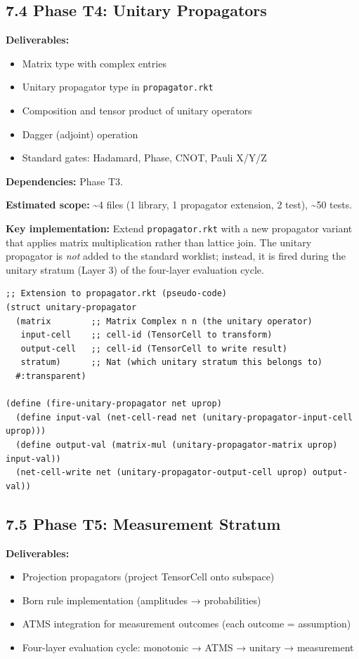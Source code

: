 \documentclass[11pt]{article}
\begin{document}
\subsection{7.4 Phase T4: Unitary Propagators}
\label{sec:orga794a54}

\textbf{Deliverables:}
\begin{itemize}
\item Matrix type with complex entries
\item Unitary propagator type in \texttt{propagator.rkt}
\item Composition and tensor product of unitary operators
\item Dagger (adjoint) operation
\item Standard gates: Hadamard, Phase, CNOT, Pauli X/Y/Z
\end{itemize}

\textbf{Dependencies:} Phase T3.

\textbf{Estimated scope:} \textasciitilde{}4 files (1 library, 1 propagator extension, 2 test), \textasciitilde{}50 tests.

\textbf{Key implementation:} Extend \texttt{propagator.rkt} with a new propagator variant that
applies matrix multiplication rather than lattice join. The unitary propagator is
\emph{not} added to the standard worklist; instead, it is fired during the unitary
stratum (Layer 3) of the four-layer evaluation cycle.

\begin{verbatim}
;; Extension to propagator.rkt (pseudo-code)
(struct unitary-propagator
  (matrix        ;; Matrix Complex n n (the unitary operator)
   input-cell    ;; cell-id (TensorCell to transform)
   output-cell   ;; cell-id (TensorCell to write result)
   stratum)      ;; Nat (which unitary stratum this belongs to)
  #:transparent)

(define (fire-unitary-propagator net uprop)
  (define input-val (net-cell-read net (unitary-propagator-input-cell uprop)))
  (define output-val (matrix-mul (unitary-propagator-matrix uprop) input-val))
  (net-cell-write net (unitary-propagator-output-cell uprop) output-val))
\end{verbatim}
\subsection{7.5 Phase T5: Measurement Stratum}
\label{sec:org5bfccdc}

\textbf{Deliverables:}
\begin{itemize}
\item Projection propagators (project TensorCell onto subspace)
\item Born rule implementation (amplitudes → probabilities)
\item ATMS integration for measurement outcomes (each outcome = assumption)
\item Four-layer evaluation cycle: monotonic → ATMS → unitary → measurement
\end{itemize}
\end{document}
